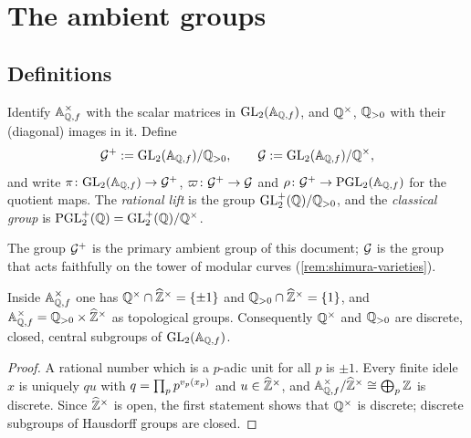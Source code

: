 \section{The ambient groups}\label{sec:ambient}

\subsection{Definitions}

\begin{definition}\label{def:ambient}
Identify $\mathbb{A}_{\mathbb{Q},f}^{\times}$ with the scalar matrices in
$\GL{2}{\FiniteAdeles{\QQ}}$, and $\mathbb{Q}^{\times}$, $\mathbb{Q}_{>0}$ with
their (diagonal) images in it. Define
\[
  \AdelicGroup := \GL{2}{\FiniteAdeles{\QQ}}/\PositiveRationals, \qquad
  \AdelicGroupCoarse := \GL{2}{\FiniteAdeles{\QQ}}/\unit{\QQ},
\]
and write $\AdelicProjection \colon \GL{2}{\FiniteAdeles{\QQ}} \to \AdelicGroup$,
$\varpi \colon \mathcal{G}^{+} \to \mathcal{G}$ and
$\ProjectionToPGL \colon \AdelicGroup \to \PGL{2}{\FiniteAdeles{\QQ}}$ for the
quotient maps. The \emph{rational lift} is the group
$\mathrm{GL}_{2}^{+}(\mathbb{Q})/\mathbb{Q}_{>0}$, and the \emph{classical group} is
$\mathrm{PGL}_{2}^{+}(\mathbb{Q}) = \mathrm{GL}_{2}^{+}(\mathbb{Q})/\mathbb{Q}^{\times}$.
\end{definition}

The group $\mathcal{G}^{+}$ is the primary ambient group of this document;
$\mathcal{G}$ is the group that acts faithfully on the tower of
modular curves (\cref{rem:shimura-varieties}).

\begin{lemma}\label{lem:rational-scalars-discrete}
Inside $\mathbb{A}_{\mathbb{Q},f}^{\times}$ one has
$\mathbb{Q}^{\times} \cap \widehat{\mathbb{Z}}^{\times} = \{\pm 1\}$ and
$\mathbb{Q}_{>0} \cap \widehat{\mathbb{Z}}^{\times} = \{1\}$, and
$\mathbb{A}_{\mathbb{Q},f}^{\times} = \mathbb{Q}_{>0} \times \widehat{\mathbb{Z}}^{\times}$
as topological groups. Consequently $\mathbb{Q}^{\times}$ and $\mathbb{Q}_{>0}$
are discrete, closed, central subgroups of $\GL{2}{\FiniteAdeles{\QQ}}$.
\end{lemma}

\begin{proof}
A rational number which is a $p$-adic unit for all $p$ is $\pm 1$. Every
finite idele $x$ is uniquely $q u$ with $q = \prod_p p^{v_{p}(x_p)}$ and
$u \in \widehat{\mathbb{Z}}^{\times}$, and $\mathbb{A}_{\mathbb{Q},f}^{\times}/\widehat{\mathbb{Z}}^{\times}
\cong \bigoplus_p \mathbb{Z}$ is discrete. Since $\widehat{\mathbb{Z}}^{\times}$ is
open, the first statement shows that $\mathbb{Q}^{\times}$ is discrete; discrete
subgroups of Hausdorff groups are closed.
\end{proof}

